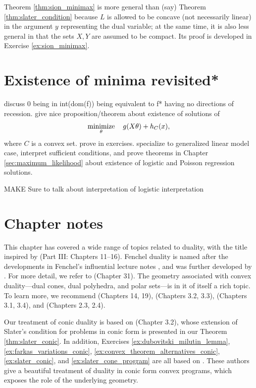 Theorem \ref{thm:sion_minimax} is more general than (say) Theorem
\ref{thm:slater_condition} because $L$ is allowed to be concave (not
necessarily linear) in the argument $y$ representing the dual variable; at the
same time, it is also less general in that the sets $X,Y$ are assumed to be 
compact. Its proof is developed in Exercise \ref{ex:sion_minimax}.   

\section{Existence of minima revisited*}
\label{sec:existence_minima_revisited}

discuss 0 being in int(dom(f)) being equivalent to f* having no directions
of recession.  give nice proposition/theorem about existence of solutions of 
$$
\operatorname*{minimize}_\theta \quad g(X \theta) + h_C(x),
$$
where $C$ is a convex set. prove in exercises. specialize to generalized linear
model case, interpret sufficient conditions, and prove theorems in Chapter
\ref{sec:maximum_likelihood} about existence of logistic and Poisson regression
solutions. 


MAKE Sure to talk about interpretation of logistic interpretation

\SkipTocEntry\section*{Chapter notes}

This chapter has covered a wide range of topics related to duality, with the
title inspired by \cite{rockafellar1970convex} (Part III: Chapters 11--16). 
Fenchel duality is named after the developments in Fenchel's influential lecture
notes \cite{fenchel1951convex}, and was further developed by
\cite{rockafellar1963convex}. For more detail, we refer to
\cite{rockafellar1970convex} (Chapter 31). The geometry associated with convex 
duality---dual cones, dual polyhedra, and polar sets---is in it of itself a rich
topic. To learn more, we recommend \cite{rockafellar1970convex} (Chapters 14,
19), \cite{bertsekas2009convex} (Chapters 3.2, 3.3), \cite{grunbaum2003convex}  
(Chapters 3.1, 3.4), and \cite{ziegler1995lectures} (Chapters 2.3, 2.4).       

Our treatment of conic duality is based on \cite{bental2023convex} (Chapter
3.2), whose extension of Slater's condition for problems in conic form is
presented in our Theorem \ref{thm:slater_conic}. In addition, Exercises
\ref{ex:dubovitski_milutin_lemma}, \ref{ex:farkas_variations_conic}, 
\ref{ex:convex_theorem_alternatives_conic}, \ref{ex:slater_conic}, and   
\ref{ex:slater_cone_program} are all based on \cite{bental2023convex}. These
authors give a beautiful treatment of duality in conic form convex programs, 
which exposes the role of the underlying geometry.

